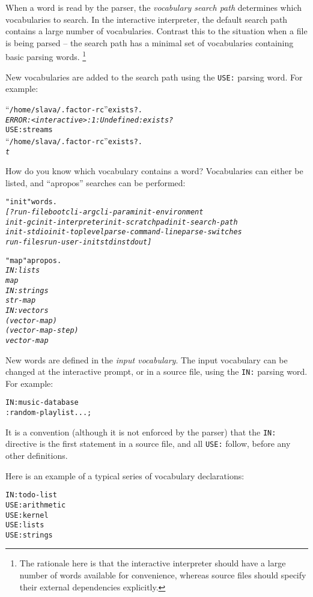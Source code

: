 \documentclass[english]{article}
\begin{document}
When a word is read by the parser, the \emph{vocabulary search path}
determines which vocabularies to search. In the interactive interpreter,
the default search path contains a large number of vocabularies. Contrast
this to the situation when a file is being parsed -- the search path
has a minimal set of vocabularies containing basic parsing words.%
\footnote{The rationale here is that the interactive interpreter should have
a large number of words available for convenience, whereas
source files should specify their external dependencies explicitly.%
}

New vocabularies are added to the search path using the \texttt{USE:}
parsing word. For example:

\begin{alltt}
{}``/home/slava/.factor-rc'' exists? .
\emph{ERROR: <interactive>:1: Undefined: exists?}
USE: streams
{}``/home/slava/.factor-rc'' exists? .
\emph{t}
\end{alltt}
How do you know which vocabulary contains a word? Vocabularies can
either be listed, and ``apropos'' searches can be performed:

\begin{alltt}
"init" words.
\emph{{[} ?run-file boot cli-arg cli-param init-environment}
\emph{init-gc init-interpreter init-scratchpad init-search-path}
\emph{init-stdio init-toplevel parse-command-line parse-switches}
\emph{run-files run-user-init stdin stdout {]} }

"map" apropos.
\emph{IN: lists}
\emph{map}
\emph{IN: strings}
\emph{str-map}
\emph{IN: vectors}
\emph{(vector-map)}
\emph{(vector-map-step)}
\emph{vector-map }
\end{alltt}
New words are defined in the \emph{input vocabulary}. The input vocabulary
can be changed at the interactive prompt, or in a source file, using
the \texttt{IN:} parsing word. For example:

\begin{alltt}
IN: music-database
: random-playlist ... ;
\end{alltt}
It is a convention (although it is not enforced by the parser) that
the \texttt{IN:} directive is the first statement in a source file,
and all \texttt{USE:} follow, before any other definitions.

Here is an example of a typical series of vocabulary declarations:

\begin{alltt}
IN: todo-list
USE: arithmetic
USE: kernel
USE: lists
USE: strings
\end{alltt}
\end{document}

